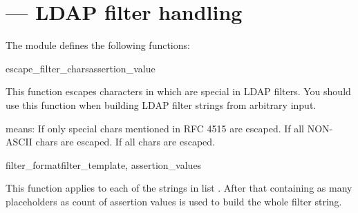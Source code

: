 
\section{ ---
  LDAP filter handling }




\begin{seealso}
\end{seealso}

The  module defines the following functions:

\begin{funcdesc}{escape_filter_chars}{assertion_value} %

This function escapes characters in  which
are special in LDAP filters. You should use this function when
building LDAP filter strings from arbitrary input.

 means:
If  only special chars mentioned in RFC 4515 are escaped.
If  all NON-ASCII chars are escaped.
If  all chars are escaped.

\end{funcdesc}

\begin{funcdesc}{filter_format}{filter_template, assertion_values} %

This function applies  to each of the strings in
list . After that  containing
as many  placeholders as count of assertion values is
used to build the whole filter string.

\end{funcdesc}
